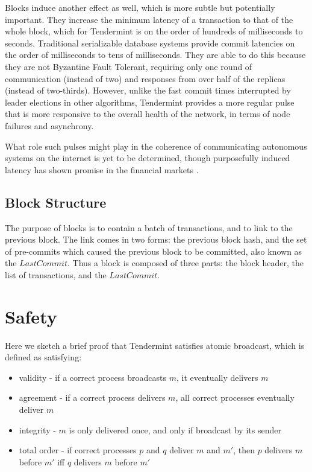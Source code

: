 Blocks induce another effect as well, which is more subtle but potentially important. 
They increase the minimum latency of a transaction to that of the whole block, 
which for Tendermint is on the order of hundreds of milliseconds to seconds.
Traditional serializable database systems provide commit latencies on the 
order of milliseconds to tens of milliseconds.
They are able to do this because they are not Byzantine Fault Tolerant, 
requiring only one round of communication (instead of two)
and responses from over half of the replicas (instead of two-thirds).
However, unlike the fast commit times interrupted by leader elections in other algorithms,
Tendermint provides a more regular pulse that is more responsive to the overall health of the network, 
in terms of node failures and asynchrony.

What role such pulses might play in the coherence of 
communicating autonomous systems on the internet is yet to be determined,
though purposefully induced latency has shown promise in the financial markets \cite{ryan2015beyond}.

\subsection{Block Structure}

The purpose of blocks is to contain a batch of transactions, and to link to the previous block.
The link comes in two forms: the previous block hash,
and the set of pre-commits which caused the previous block to be committed, also known as the $LastCommit$.
Thus a block is composed of three parts: the block header, the list of transactions, and the $LastCommit$.

\section{Safety}

Here we sketch a brief proof that Tendermint satisfies atomic broadcast,
which is defined as satisfying:

\begin{itemize}
\item validity - if a correct process broadcasts $m$, it eventually delivers $m$
\item agreement - if a correct process delivers $m$, all correct processes eventually deliver $m$
\item integrity - $m$ is only delivered once, and only if broadcast by its sender
\item total order - if correct processes $p$ and $q$ deliver $m$ and $m'$, then $p$ delivers $m$ before $m'$ iff $q$ delivers $m$ before $m'$
\end{itemize}

